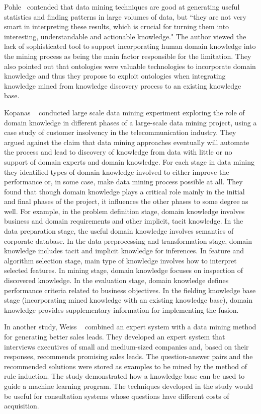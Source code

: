 Pohle~\cite{Pohle03} contended that data mining techniques are good at generating useful statistics and finding patterns in large volumes of data, but ``they are not very smart in interpreting these results, which is crucial for turning them into interesting, understandable and actionable knowledge." The author viewed the lack of sophisticated tool to support incorporating human domain knowledge into the mining process as being the main factor responsible for the limitation. They also pointed out that ontologies were valuable technologies to incorporate domain knowledge and thus they propose to exploit ontologies when integrating knowledge mined from knowledge discovery process to an existing knowledge base.

Kopanas \etal~\cite{Kopanas02} conducted large scale data mining experiment exploring the role of domain knowledge in different phases of a large-scale data mining project, using a case study of customer insolvency in the telecommunication industry. They argued against the claim that data mining approaches eventually will automate the process and lead to discovery of knowledge from data with little or no support of domain experts and domain knowledge. For each stage in data mining they identified types of domain knowledge involved to either improve the performance or, in some case, make data mining process possible at all. They found that though domain knowledge plays a critical role mainly in the initial and final phases of the project, it influences the other phases to some degree as well. For example, in the problem definition stage, domain knowledge involves business and domain requirements and other implicit, tacit knowledge. In the data preparation stage, the useful domain knowledge involves semantics of corporate database. In the data preprocessing and transformation stage, domain knowledge includes tacit and implicit knowledge for inferences. In feature and algorithm selection stage, main type of knowledge involves how to interpret selected features. In mining stage, domain knowledge focuses on inspection of discovered knowledge. In the evaluation stage, domain knowledge defines performance criteria related to business objectives. In the fielding knowledge base stage (incorporating mined knowledge with an existing knowledge base), domain knowledge provides supplementary information for implementing the fusion.

In another study, Weiss \etal~\cite{Weiss01} combined an expert system with a data mining method for generating better sales leads. They developed an expert system that interviews executives of small and medium-sized companies and, based on their responses, recommends promising sales leads. The question-answer pairs and the recommended solutions were stored as examples to be mined by the method of rule induction. The study demonstrated how a knowledge base can be used to guide a machine learning program. The techniques developed in the study would be useful for consultation systems whose questions have different costs of acquisition.

